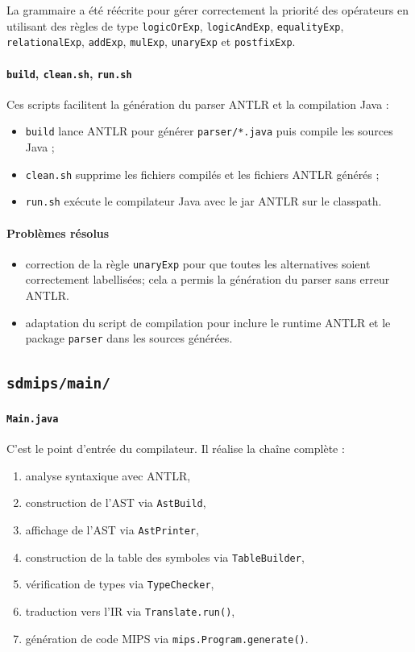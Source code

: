 \documentclass[a4paper,11pt]{article}
\begin{document}
La grammaire a été réécrite pour gérer correctement la priorité des opérateurs en utilisant des règles de type \texttt{logicOrExp}, \texttt{logicAndExp}, \texttt{equalityExp}, \texttt{relationalExp}, \texttt{addExp}, \texttt{mulExp}, \texttt{unaryExp} et \texttt{postfixExp}.

\paragraph{\texttt{build}, \texttt{clean.sh}, \texttt{run.sh}}
Ces scripts facilitent la génération du parser ANTLR et la compilation Java :
\begin{itemize}
  \item \texttt{build} lance ANTLR pour générer \texttt{parser/*.java} puis compile les sources Java ;
  \item \texttt{clean.sh} supprime les fichiers compilés et les fichiers ANTLR générés ;
  \item \texttt{run.sh} exécute le compilateur Java avec le jar ANTLR sur le classpath.
\end{itemize}

\paragraph{Problèmes résolus}
\begin{itemize}
  \item correction de la règle \texttt{unaryExp} pour que toutes les alternatives soient correctement labellisées; cela a permis la génération du parser sans erreur ANTLR.
  \item adaptation du script de compilation pour inclure le runtime ANTLR et le package \texttt{parser} dans les sources générées.
\end{itemize}

\subsection{\texttt{sdmips/main/}}
\paragraph{\texttt{Main.java}}
C'est le point d'entrée du compilateur. Il réalise la chaîne complète :
\begin{enumerate}
  \item analyse syntaxique avec ANTLR,
  \item construction de l'AST via \texttt{AstBuild},
  \item affichage de l'AST via \texttt{AstPrinter},
  \item construction de la table des symboles via \texttt{TableBuilder},
  \item vérification de types via \texttt{TypeChecker},
  \item traduction vers l'IR via \texttt{Translate.run()},
  \item génération de code MIPS via \texttt{mips.Program.generate()}. 
\end{enumerate}
\end{document}
